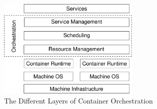 \begin{figure}[]
    \centering
    \includegraphics[width=0.6\textwidth]{graphics/orch_layers.svg}
    \caption{The Different Layers of Container Orchestration~\cite{Orch2}}
    \label{fig:orch_levels}
\end{figure}

